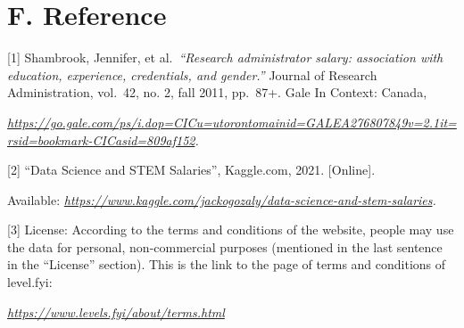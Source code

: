 \documentclass[
]{article}
\begin{document}
\hypertarget{f.-reference}{%
\section{F. Reference}\label{f.-reference}}

{[}1{]} Shambrook, Jennifer, et al.~\emph{``Research administrator
salary: association with education, experience, credentials, and
gender.''} Journal of Research Administration, vol.~42, no. 2, fall
2011, pp.~87+. Gale In Context: Canada,

\href{https://go.gale.com/ps/i.dop=CICu=utorontomainid=GALEA276807849v=2.1it=rsid=bookmark-CICasid=809af152}{\emph{https://go.gale.com/ps/i.dop=CICu=utorontomainid=GALEA276807849v=2.1it=rsid=bookmark-CICasid=809af152}}\emph{.}

{[}2{]} ``Data Science and STEM Salaries'', Kaggle.com, 2021.
{[}Online{]}.

Available:
\href{https://www.kaggle.com/jackogozaly/data-science-and-stem-salaries}{\emph{https://www.kaggle.com/jackogozaly/data-science-and-stem-salaries}}\emph{.}

{[}3{]} License: According to the terms and conditions of the website,
people may use the data for personal, non-commercial purposes (mentioned
in the last sentence in the ``License'' section). This is the link to
the page of terms and conditions of level.fyi:

\href{https://www.levels.fyi/about/terms.html}{\emph{https://www.levels.fyi/about/terms.html}}
\end{document}
